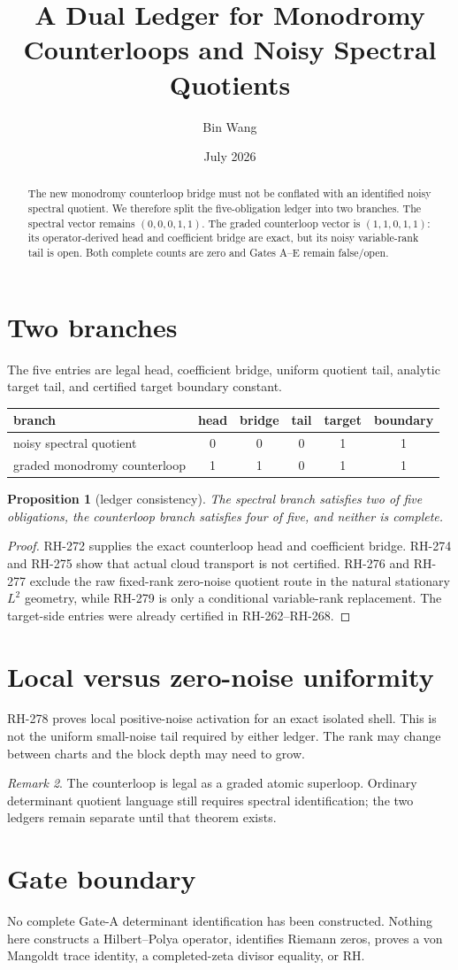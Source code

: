 \documentclass[11pt]{article}
\title{A Dual Ledger for Monodromy Counterloops and Noisy Spectral Quotients}\author{Bin Wang}\date{July 2026}
\newtheorem{proposition}{Proposition}[section]\theoremstyle{remark}\newtheorem{remark}[proposition]{Remark}
\begin{document}
\maketitle
\begin{abstract}
The new monodromy counterloop bridge must not be conflated with an identified
noisy spectral quotient.  We therefore split the five-obligation ledger into
two branches.  The spectral vector remains $(0,0,0,1,1)$.  The graded
counterloop vector is $(1,1,0,1,1)$: its operator-derived head and coefficient
bridge are exact, but its noisy variable-rank tail is open.  Both complete
counts are zero and Gates A--E remain false/open.
\end{abstract}
\section{Two branches}
The five entries are legal head, coefficient bridge, uniform quotient tail,
analytic target tail, and certified target boundary constant.
\begin{center}\small
\begin{tabular}{lccccc}\toprule
branch & head & bridge & tail & target & boundary\\\midrule
noisy spectral quotient & 0&0&0&1&1\\
graded monodromy counterloop & 1&1&0&1&1\\\bottomrule
\end{tabular}
\end{center}
\begin{proposition}[ledger consistency]
The spectral branch satisfies two of five obligations, the counterloop branch
satisfies four of five, and neither is complete.
\end{proposition}
\begin{proof}
RH-272 supplies the exact counterloop head and coefficient bridge.  RH-274
and RH-275 show that actual cloud transport is not certified.  RH-276 and
RH-277 exclude the raw fixed-rank zero-noise quotient route in the natural
stationary $L^2$ geometry, while RH-279 is only a conditional variable-rank
replacement.  The target-side entries were
already certified in RH-262--RH-268.
\end{proof}
\section{Local versus zero-noise uniformity}
RH-278 proves local positive-noise activation for an exact isolated shell.
This is not the uniform small-noise tail required by either ledger.  The rank
may change between charts and the block depth may need to grow.
\begin{remark}
The counterloop is legal as a graded atomic superloop.  Ordinary determinant
quotient language still requires spectral identification; the two ledgers
remain separate until that theorem exists.
\end{remark}
\section{Gate boundary}
No complete Gate-A determinant identification has been constructed.  Nothing
here constructs a Hilbert--Polya operator, identifies Riemann zeros, proves a
von Mangoldt trace identity, a completed-zeta divisor equality, or RH.
\end{document}
